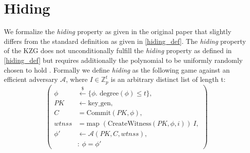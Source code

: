 \section{Hiding}
We formalize the \textit{hiding} property as given in the original paper \parencite{KZG} that slightly differs from the standard definition as given in \ref{hiding_def}. 
The \textit{hiding} property of the KZG does not unconditionally fulfill the \textit{hiding} property as defined in \ref{hiding_def} but requires additionally the polynomial to be uniformly randomly chosen to hold \parencite{KZG}. Formally we define \textit{hiding} as the following game against an efficient adversary $\mathcal{A}$, where $I\in\mathbb{Z}_p^t$ is an arbitrary distinct list of length t:
\begin{equation*}
    \left(
        \begin{aligned}
            \phi & \overset{{\scriptscriptstyle\$}}{\leftarrow} \{\phi. \text{ degree}(\phi)\le t\},\\
            PK & \leftarrow \text{key\_gen}, \\
            C & = \text{Commit}(PK,\phi), \\
            wtnss &= \text{map } (\text{CreateWitness}(PK,\phi,i))\ I,\\
            \phi' & \leftarrow \mathcal{A}(PK,C,wtnss), \\
            & : \ \phi = \phi'
        \end{aligned}
    \right)
\end{equation*}

